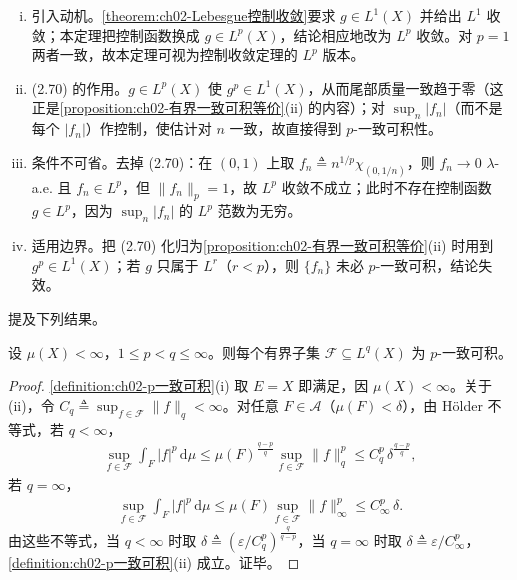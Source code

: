 \documentclass[../../main.tex]{subfiles}%
\begin{document}
\begin{remark}\label{remark:ch02-Vitali推广}
\begin{enumerate}[(i)]
\item 引入动机。\cref{theorem:ch02-Lebesgue控制收敛}要求 $g\in L^1(X)$ 并给出 $L^1$ 收敛；本定理把控制函数换成 $g\in L^p(X)$，结论相应地改为 $L^p$ 收敛。对 $p=1$ 两者一致，故本定理可视为控制收敛定理的 $L^p$ 版本。
\item (2.70) 的作用。$g\in L^p(X)$ 使 $g^p\in L^1(X)$，从而尾部质量一致趋于零（这正是\cref{proposition:ch02-有界一致可积等价}(ii) 的内容）；对 $\sup_n|f_n|$（而不是每个 $|f_n|$）作控制，使估计对 $n$ 一致，故直接得到 $p$-一致可积性。
\item 条件不可省。去掉 (2.70)：在 $(0,1)$ 上取 $f_n\triangleq n^{1/p}\chi_{(0,1/n)}$，则 $f_n\to0$ $\lambda$-a.e. 且 $f_n\in L^p$，但 $\|f_n\|_p=1$，故 $L^p$ 收敛不成立；此时不存在控制函数 $g\in L^p$，因为 $\sup_n|f_n|$ 的 $L^p$ 范数为无穷。
\item 适用边界。把 (2.70) 化归为\cref{proposition:ch02-有界一致可积等价}(ii) 时用到 $g^p\in L^1(X)$；若 $g$ 只属于 $L^r$（$r<p$），则 $\{f_n\}$ 未必 $p$-一致可积，结论失效。
\end{enumerate}
\end{remark}

提及下列结果。

\begin{lemma}\label{lemma:ch02-有界一致可积}
设 $\mu(X)<\infty$，$1\leqslant p<q\leqslant\infty$。则每个有界子集 $\mathscr F\subseteq L^q(X)$ 为 $p$-一致可积。
\end{lemma}

\begin{proof}
\cref{definition:ch02-p一致可积}(i) 取 $E=X$ 即满足，因 $\mu(X)<\infty$。关于 (ii)，令 $C_q\triangleq \sup_{f\in\mathscr F}\|f\|_q<\infty$。对任意 $F\in\mathscr A$（$\mu(F)<\delta$），由 H\"older 不等式，若 $q<\infty$，
\begin{align*}
\sup_{f\in\mathscr F}\int_F|f|^p\,\mathrm{d}\mu
\leqslant\mu(F)^{\frac{q-p}{q}}\sup_{f\in\mathscr F}\|f\|_q^p
\leqslant C_q^p\,\delta^{\frac{q-p}{q}},
\end{align*}
若 $q=\infty$，
\begin{align*}
\sup_{f\in\mathscr F}\int_F|f|^p\,\mathrm{d}\mu
\leqslant\mu(F)\sup_{f\in\mathscr F}\|f\|_\infty^p
\leqslant C_\infty^p\,\delta.
\end{align*}
由这些不等式，当 $q<\infty$ 时取 $\delta\triangleq \left(\varepsilon/C_q^p\right)^{\frac{q}{q-p}}$，当 $q=\infty$ 时取 $\delta\triangleq \varepsilon/C_\infty^p$，\cref{definition:ch02-p一致可积}(ii) 成立。证毕。
\end{proof}
\end{document}
